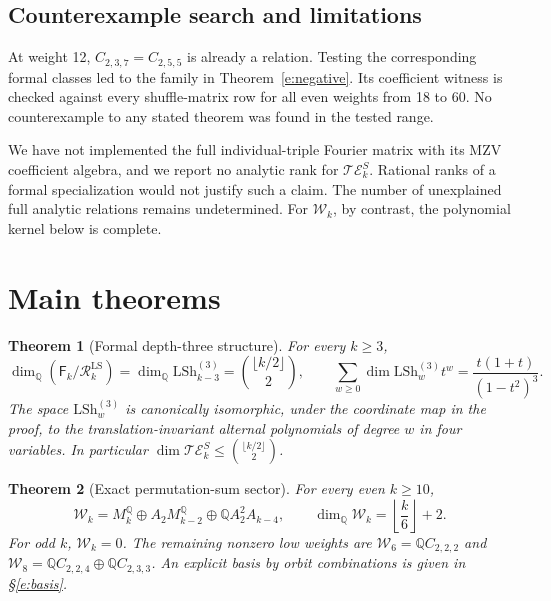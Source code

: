 \documentclass[12pt]{amsart}
\newtheorem{thm}{Theorem}[section]
\theoremstyle{definition}
\theoremstyle{remark}
\numberwithin{equation}{section}
\newcommand{\Q}{\mathbb{Q}}
\newcommand{\LS}{\mathrm{LSh}}
\newcommand{\RR}{\mathcal R^{\mathrm{LS}}}
\newcommand{\WW}{\mathcal W}
\newcommand{\FF}{\mathsf F}
\numberwithin{equation}{section}
\begin{document}
\subsection{Counterexample search and limitations}
At weight 12, $C_{2,3,7}=C_{2,5,5}$ is already a relation.
Testing the corresponding formal classes led to the family in
Theorem~\ref{e:negative}. Its coefficient witness is checked against every
shuffle-matrix row for all even weights from 18 to 60.
No counterexample to any stated theorem was found in the tested range.

We have not implemented the full individual-triple Fourier matrix with its
MZV coefficient algebra, and we report no analytic rank for
$\mathcal{TE}_k^S$. Rational ranks of a formal specialization would not justify
such a claim. The number of unexplained full analytic relations remains
undetermined. For $\WW_k$, by contrast, the polynomial kernel below is complete.

\section{Main theorems}
\begin{thm}[Formal depth-three structure]\label{e:formal}
For every $k\ge3$,
\[
 \dim_{\Q}(\FF_k/\RR_k)=\dim_{\Q}\LS_{k-3}^{(3)}
      =\binom{\lfloor k/2\rfloor}{2},\qquad
 \sum_{w\ge0}\dim\LS_w^{(3)}t^w=\frac{t(1+t)}{(1-t^2)^3}.
\]
The space $\LS_w^{(3)}$ is canonically isomorphic, under the coordinate
map in the proof, to the translation-invariant alternal polynomials of
degree $w$ in four variables. In particular
$\dim\mathcal{TE}_k^S\le\binom{\lfloor k/2\rfloor}{2}$.
\end{thm}

\begin{thm}[Exact permutation-sum sector]\label{e:orbit}
For every even $k\ge10$,
\begin{equation}\label{e:decomp}
 \WW_k=M_k^{\Q}\oplus A_2M_{k-2}^{\Q}\oplus\Q A_2^2A_{k-4},
 \qquad \dim_{\Q}\WW_k=\left\lfloor\frac{k}{6}\right\rfloor+2.
\end{equation}
For odd $k$, $\WW_k=0$. The remaining nonzero low weights are
$\WW_6=\Q C_{2,2,2}$ and
$\WW_8=\Q C_{2,2,4}\oplus\Q C_{2,3,3}$.
An explicit basis by orbit combinations is given in \S\ref{e:basis}.
\end{thm}
\end{document}
